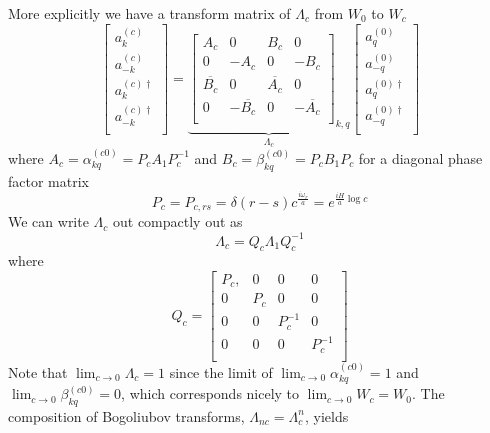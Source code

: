\documentclass[12pt,a4paper]{article}
\begin{document}
More explicitly we have a transform matrix of $\Lambda_c$ from $W_0$ to $W_c$ 
\begin{equation}
  \left[ \begin{array}{l}
    a^{(c)}_k \\
    a^{(c)}_{-k} \\
    \hline
    a^{(c)\dagger}_k \\
    a^{(c)\dagger}_{-k} \\
 \end{array} \right] = \underbrace{
  \left[
\begin{array}{rr|rr}
    A_c        &       0   &  B_c            &  0 \\
    0        &      -A_c   &  0            & -B_c \\
    \hline
    \overline{B_c}        &    0      &  \overline{A_c} & 0 \\
    0 &    -\overline{B_c}      &   0           & -\overline{A_c} \\
\end{array} \right]_{k,q} }_{\Lambda_c}
  \left[ \begin{array}{l}
    a^{(0)}_q \\
    a^{(0)}_{-q} \\
    \hline
    a^{(0)\dagger}_q \\
    a^{(0)\dagger}_{-q} \\
 \end{array} \right]
\end{equation}
where $A_c = \alpha_{kq}^{(c0)} = P_c A_1 P_c^{-1}$  and $B_c = \beta_{kq}^{(c0)} = P_c B_1 P_c$ for a diagonal phase factor matrix
\begin{equation}
  P_c = P_{c,rs} = \delta(r - s) c^{\frac{i\omega_r}{a}} = e^{\frac{i H}{a} \log c}
\end{equation}
We can write $\Lambda_c$ out compactly out as
\begin{equation}
  \Lambda_c = Q_c \Lambda_1 Q_c^{-1}
\end{equation}
where
\begin{equation}
  Q_c = \left[\begin{array}{cccc}
        P_c, & 0 & 0 & 0 \\
        0 & P_c & 0 & 0 \\
        0 & 0 & P_c^{-1} & 0 \\
        0 & 0 & 0 & P_c^{-1} \\
    \end{array} \right] 
\end{equation}
Note that $\lim_{c\to 0} \Lambda_c = 1$ since the limit of $\lim_{c\to 0} \alpha_{kq}^{(c0)} = 1$ and $\lim_{c\to 0} \beta_{kq}^{(c0)} = 0$, which corresponds nicely to $\lim_{c\to 0} W_c = W_0$. The composition of Bogoliubov transforms, $\Lambda_{nc} = \Lambda_c^n$, yields
\end{document}
